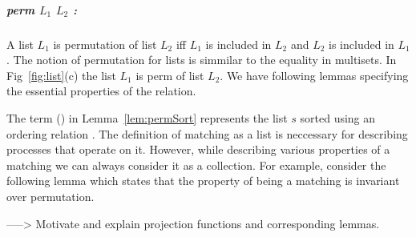 \documentclass[a4paper,UKenglish,cleveref, autoref]{lipics-v2019}
\begin{document}
\subparagraph*{perm $L_1$ $L_2$ :} A list $L_1$  is permutation of list $L_2$  iff $L_1$  is included in $L_2$ and $L_2$ is included in $L_1$.  The notion of permutation for lists is simmilar to the equality in multisets. In Fig~\ref{fig:list}(c) the list $L_1$  is perm of list $L_2$. We have following lemmas specifying the essential properties of the  relation.

\begin{lemma}
\end{lemma}
\begin{lemma}
\end{lemma}
\begin{lemma}\label{lem:permSort}
\end{lemma}

The term (\emph{}) in Lemma~\ref{lem:permSort} represents the list $s$ sorted using an ordering relation . The definition of matching as a list is neccessary for describing processes that operate on it. However, while describing various properties of a matching we can always consider it as a collection. For example, consider the following lemma which states that the property of  being a matching is invariant over permutation. 
\begin{lemma}
\end{lemma}
-----> Motivate and explain projection functions and corresponding lemmas. 

\begin{lemma}
\tw{ \textcolor{gray}{ } }
\end{lemma}
\end{document}
